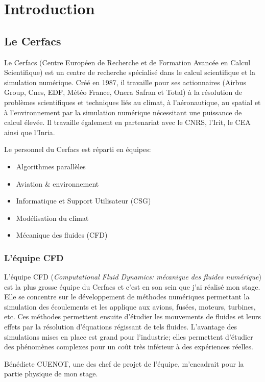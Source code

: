 \section{Introduction}
\subsection{Le Cerfacs}\label{sec:intro}

Le Cerfacs (Centre Européen de Recherche et de Formation Avancée en Calcul Scientifique) est un centre de recherche spécialisé dans le calcul scientifique et la simulation numérique. Créé en 1987, il travaille pour ses actionnaires (Airbus Group, Cnes, EDF, Météo France, Onera Safran et Total) à la résolution de problèmes scientifiques et techniques liés au climat, à l'aéronautique, au spatial et à l'environnement par la simulation numérique nécessitant une puissance de calcul élevée. Il travaille également en partenariat avec le CNRS, l'Irit, le CEA ainsi que l'Inria.


Le personnel du Cerfacs est réparti en équipes:
\begin{itemize}
\item Algorithmes parallèles
\item Aviation \& environnement
\item Informatique et Support Utilisateur (CSG)
\item Modélisation du climat
\item Mécanique des fluides (CFD)
\end{itemize}

\subsubsection{L'équipe CFD}
L'équipe CFD (\textit{Computational Fluid Dynamics: mécanique des fluides numérique}) est la plus grosse équipe du Cerfacs et c'est en son sein que j'ai réalisé mon stage. Elle se concentre sur le développement de méthodes numériques permettant la simulation des écoulements et les applique aux avions, fusées, moteurs, turbines, etc. Ces méthodes permettent ensuite d'étudier les mouvements de fluides et leurs effets par la résolution d'équations régissant de tels fluides. L'avantage des simulations mises en place est grand pour l'industrie; elles permettent d'étudier des phénomènes complexes pour un coût très inférieur à des expériences réelles.

Bénédicte CUENOT, une des chef de projet de l'équipe, m'encadrait pour la partie physique de mon stage.


